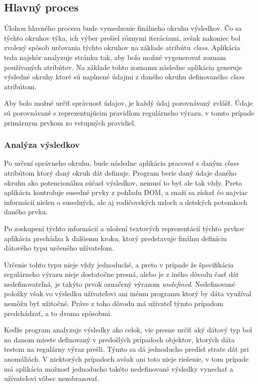 \subsection{Hlavný proces}

Úlohou hlavného procesu bude vymedzenie finálneho okruhu výsledkov. Čo sa týchto okruhov týka, ich výber prešiel rôznymi iteráciami, avšak nakoniec bol zvolený spôsob určovania týchto okruhov na základe atribútu \textit{class}. Aplikácia teda najskôr analyzuje stránku tak, aby bolo možné vygenerovať zoznam používaných atribútov. Na základe tohto zoznamu následne aplikácia generuje výsledné okruhy ktoré sú naplnené údajmi z daného okruhu definovaného \textit{class} atribútom. 

Aby bolo možné určiť správnosť údajov, je každý údaj porovnávaný zvlášť. Údaje sú porovnávané s reprezentujúcim pravidlom regulárneho výrazu, v tomto prípade primárnym prvkom zo vstupných pravidiel.

\newpage
\subsubsection{Analýza výsledkov}

Po určení správneho okruhu, bude následne aplikácia pracovať s daným \textit{class} atribútom ktorý daný okruh dát definuje. Program berie daný údaje daného okruhu ako potencionálnu súčasť výsledkov, nemusí to byť ale tak vždy. Preto aplikácia kontroluje susedné prvky z pohľadu DOM, a snaží sa získať čo najviac informácií nielen o susedných, ale aj rodičovských uzloch a detských potomkoch daného prvku.

Po zoskupení týchto informácií a uložení textových reprezentácií týchto prvkov aplikácia prechádza k ďalšiemu kroku, ktorý predstavuje finálnu definíciu  dátového typu určeného užívateľom.

\bigskip

Určenie tohto typu nieje vždy jednoduché, a preto v prípade že špecifikácia regulárneho výrazu nieje dostatočne presná, alebo je z iného dôvodu časť dát nedefinovateľná, je takýto prvok označený výrazom \textit{undefined}. Nedefinované položky však vo výsledku užívateľovi ani inému programu ktorý by dáta využíval nemôžu byť užitočné. Práve z toho dôvodu má užívateľ týmto prípadom predchádzať, a to dvoma spôsobmi. 

Keďže program analyzuje výsledky ako celok, vie presne určiť aký dátový typ bol na danom mieste definovaný v predošlých prípadoch objektov, ktorých dáta testom na regulárny výraz prešli. Týmto sa dá jednoducho predísť strate dát pri anomáliách. V niektorých prípadoch avšak ani toto nieje riešenie, v tom prípade má aplikácia možnosť jednoducho takéto nedefinované výsledky vynechať a užívateľovi vôbec nezobrazovať.

